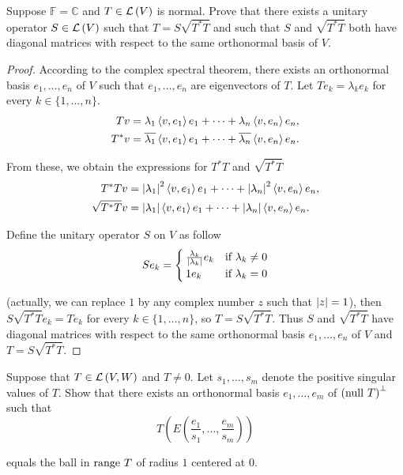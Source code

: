 \begin{exercise}
    Suppose $\mathbb{F} = \mathbb{C}$ and $T \in \mathcal{L}\left({V}\right)$ is normal. Prove that there exists a unitary operator $S \in \mathcal{L}\left({V}\right)$ such that $T = S\sqrt{T^{*}T}$ and such that $S$ and $\sqrt{T^{*}T}$ both have diagonal matrices with respect to the same orthonormal basis of $V$.
\end{exercise}

\begin{proof}
    According to the complex spectral theorem, there exists an orthonormal basis $e_{1}, \ldots, e_{n}$ of $V$ such that $e_{1}, \ldots, e_{n}$ are eigenvectors of $T$. Let $Te_{k} = \lambda_{k}e_{k}$ for every $k\in\{1,\ldots,n\}$.
    \begin{align*}
        Tv     & = \lambda_{1}\left\langle{v,e_{1}}\right\rangle e_{1} + \cdots + \lambda_{n}\left\langle{v,e_{n}}\right\rangle e_{n},               \\
        T^{*}v & = \overline{\lambda_{1}}\left\langle{v,e_{1}}\right\rangle e_{1} + \cdots + \overline{\lambda_{n}}\left\langle{v,e_{n}}\right\rangle e_{n}.
    \end{align*}

    From these, we obtain the expressions for $T^{*}T$ and $\sqrt{T^{*}T}$
    \begin{align*}
        T^{*}Tv        & = \left\vert{\lambda_{1}}\right\vert^{2}\left\langle{v,e_{1}}\right\rangle e_{1} + \cdots + \left\vert{\lambda_{n}}\right\vert^{2}\left\langle{v,e_{n}}\right\rangle e_{n}, \\
        \sqrt{T^{*}T}v & = \left\vert{\lambda_{1}}\right\vert\left\langle{v,e_{1}}\right\rangle e_{1} + \cdots + \left\vert{\lambda_{n}}\right\vert\left\langle{v,e_{n}}\right\rangle e_{n}.
    \end{align*}

    Define the unitary operator $S$ on $V$ as follow
    \[
        Se_{k} = \begin{cases}
            \frac{\lambda_{k}}{\left\vert{\lambda_{k}}\right\vert}e_{k} & \text{if $\lambda_{k}\ne 0$} \\
            1e_{k}                                     & \text{if $\lambda_{k} = 0$}
        \end{cases}
    \]

    (actually, we can replace $1$ by any complex number $z$ such that $\left\vert{z}\right\vert = 1$), then $S\sqrt{T^{*}T}e_{k} = Te_{k}$ for every $k\in\{1,\ldots,n\}$, so $T = S\sqrt{T^{*}T}$. Thus $S$ and $\sqrt{T^{*}T}$ have diagonal matrices with respect to the same orthonormal basis $e_{1}, \ldots, e_{n}$ of $V$ and $T = S\sqrt{T^{*}T}$.
\end{proof}
\newpage

\begin{exercise}
    Suppose that $T\in\mathcal{L}\left({V, W}\right)$ and $T\ne 0$. Let $s_{1}, \ldots, s_{m}$ denote the positive singular values of $T$. Show that there exists an orthonormal basis $e_{1}, \ldots, e_{m}$ of ${(\operatorname{null}\,{T})}^{\bot}$ such that
    \[
        T\left( E\left( \frac{e_{1}}{s_{1}}, \ldots, \frac{e_{m}}{s_{m}} \right) \right)
    \]

    equals the ball in $\operatorname{range}\,{T}$ of radius $1$ centered at $0$.
\end{exercise}

